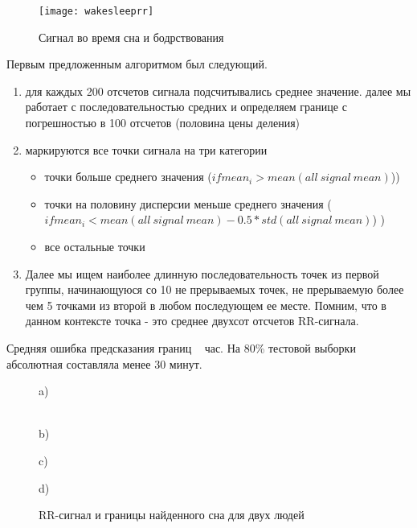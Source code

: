 \begin{figure}[h]
	\begin{center}
		\texttt{[image: wakesleeprr]}
		\caption{Сигнал во время сна и бодрствования}
		\label{ris:arh_rnn}
	\end{center}
\end{figure}

Первым предложенным алгоритмом был следующий.
\begin{enumerate}
	\item для каждых 200 отсчетов сигнала подсчитывались среднее значение. далее мы работает с последовательностью средних и определяем границе с погрешностью в 100 отсчетов (половина цены деления)
	\item маркируются все точки сигнала на три категории
	\begin{itemize}
		\item точки больше среднего значения ($if mean_i > mean(all\ signal\ mean)$))
		\item точки на половину дисперсии меньше среднего значения ($if mean_i < mean(all\ signal\ mean) - 0.5*std(all\ signal\ mean)$) )
		\item все остальные точки
	\end{itemize}
	\item Далее мы ищем наиболее длинную последовательность точек из первой группы, начинающуюся со 10 не прерываемых точек, не прерываемую более чем 5 точками из второй в любом последующем ее месте. Помним, что в данном контексте точка - это среднее двухсот отсчетов RR-сигнала.
\end{enumerate}
Средняя ошибка предсказания границ ~ час.
На 80\% тестовой выборки абсолютная составляла менее 30 минут.
\begin{figure}[h]
	\begin{minipage}[h]{0.47\linewidth}
		\center{\texttt{[image: 1104770]}} a) \\
	\end{minipage}
	\hfill
	\begin{minipage}[h]{0.47\linewidth}
		\center{\texttt{[image: 1105520]}} \\b)
	\end{minipage}
	\vfill
	\begin{minipage}[h]{0.47\linewidth}
		\center{\texttt{[image: 1104771]}} c) \\
	\end{minipage}
	\hfill
	\begin{minipage}[h]{0.47\linewidth}
		\center{\texttt{[image: 1105521]}} d) \\
	\end{minipage}
	\caption{RR-сигнал и границы найденного сна для двух людей}
	\label{ris:find_sleep_bound1}
\end{figure}

